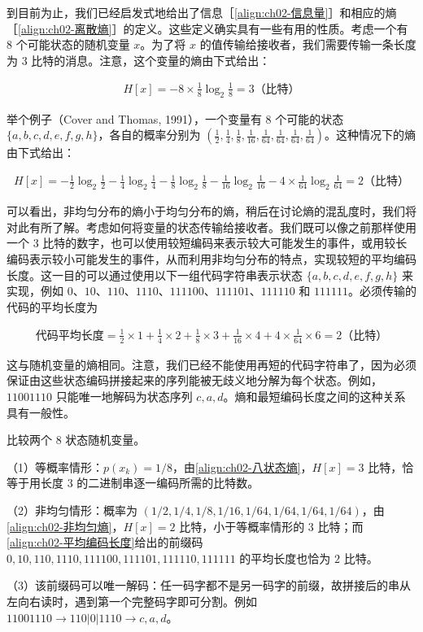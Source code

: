 \documentclass[../../main.tex]{subfiles}
\begin{document}
到目前为止，我们已经启发式地给出了信息［\eqref{align:ch02-信息量}］和相应的熵［\eqref{align:ch02-离散熵}］的定义。这些定义确实具有一些有用的性质。考虑一个有 $8$ 个可能状态的随机变量 $x$。为了将 $x$ 的值传输给接收者，我们需要传输一条长度为 $3$ 比特的消息。注意，这个变量的熵由下式给出：

\begin{align}
  H[x] = -8\times\frac{1}{8}\log_2\frac{1}{8} = 3 \text{（比特）}
  \label{align:ch02-八状态熵}
\end{align}

举个例子（Cover and Thomas, 1991），一个变量有 $8$ 个可能的状态 $\{a,b,c,d,e,f,g,h\}$，各自的概率分别为 $\left(\frac{1}{2},\frac{1}{4},\frac{1}{8},\frac{1}{16},\frac{1}{64},\frac{1}{64},\frac{1}{64},\frac{1}{64}\right)$。这种情况下的熵由下式给出：

\begin{align}
  H[x] = -\frac{1}{2}\log_2\frac{1}{2} - \frac{1}{4}\log_2\frac{1}{4} - \frac{1}{8}\log_2\frac{1}{8} - \frac{1}{16}\log_2\frac{1}{16} - 4\times\frac{1}{64}\log_2\frac{1}{64} = 2 \text{（比特）}
  \label{align:ch02-非均匀熵}
\end{align}

可以看出，非均匀分布的熵小于均匀分布的熵，稍后在讨论熵的混乱度时，我们将对此有所了解。考虑如何将变量的状态传输给接收者。我们既可以像之前那样使用一个 $3$ 比特的数字，也可以使用较短编码来表示较大可能发生的事件，或用较长编码表示较小可能发生的事件，从而利用非均匀分布的特点，实现较短的平均编码长度。这一目的可以通过使用以下一组代码字符串表示状态 $\{a,b,c,d,e,f,g,h\}$ 来实现，例如 $0$、$10$、$110$、$1110$、$111100$、$111101$、$111110$ 和 $111111$。必须传输的代码的平均长度为

\begin{align}
  \text{代码平均长度} = \frac{1}{2}\times1 + \frac{1}{4}\times2 + \frac{1}{8}\times3 + \frac{1}{16}\times4 + 4\times\frac{1}{64}\times6 = 2 \text{（比特）}
  \label{align:ch02-平均编码长度}
\end{align}

这与随机变量的熵相同。注意，我们已经不能使用再短的代码字符串了，因为必须保证由这些状态编码拼接起来的序列能被无歧义地分解为每个状态。例如，$11001110$ 只能唯一地解码为状态序列 $c,a,d$。熵和最短编码长度之间的这种关系具有一般性。

\begin{example}[ 熵与平均编码长度]\label{example:ch02-熵与编码}
比较两个 $8$ 状态随机变量。

（1）等概率情形：$p(x_k)=1/8$，由\eqref{align:ch02-八状态熵}，$H[x]=3$ 比特，恰等于用长度 $3$ 的二进制串逐一编码所需的比特数。

（2）非均匀情形：概率为 $(1/2,1/4,1/8,1/16,1/64,1/64,1/64,1/64)$，由\eqref{align:ch02-非均匀熵}，$H[x]=2$ 比特，小于等概率情形的 $3$ 比特；而\eqref{align:ch02-平均编码长度}给出的前缀码 $0,10,110,1110,111100,111101,111110,111111$ 的平均长度也恰为 $2$ 比特。

（3）该前缀码可以唯一解码：任一码字都不是另一码字的前缀，故拼接后的串从左向右读时，遇到第一个完整码字即可分割。例如 $11001110\to110|0|1110\to c,a,d$。
\end{example}
\end{document}
